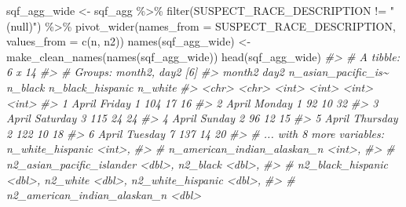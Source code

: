\documentclass[
]{krantz}
\makeatletter
\newenvironment{Shaded}{\begin{snugshade}}{\end{snugshade}}
\newcommand{\AttributeTok}[1]{\textcolor[rgb]{0.61,0.61,0.61}{#1}}
\newcommand{\CommentTok}[1]{\textcolor[rgb]{0.37,0.37,0.37}{\textit{#1}}}
\newcommand{\FunctionTok}[1]{\textcolor[rgb]{0,0,0}{#1}}
\newcommand{\NormalTok}[1]{#1}
\newcommand{\OtherTok}[1]{\textcolor[rgb]{0.37,0.37,0.37}{#1}}
\newcommand{\SpecialCharTok}[1]{\textcolor[rgb]{0,0,0}{#1}}
\newcommand{\StringTok}[1]{\textcolor[rgb]{0.5,0.5,0.5}{#1}}
\newenvironment{kframe}{%
\medskip{}
\setlength{\fboxsep}{.8em}
 \def\at@end@of@kframe{}%
 \ifinner\ifhmode%
  \def\at@end@of@kframe{\end{minipage}}%
  \begin{minipage}{\columnwidth}%
 \fi\fi%
 \def\FrameCommand##1{\hskip\@totalleftmargin \hskip-\fboxsep
 \colorbox{shadecolor}{##1}\hskip-\fboxsep
     \hskip-\linewidth \hskip-\@totalleftmargin \hskip\columnwidth}%
 \MakeFramed {\advance\hsize-\width
   \@totalleftmargin\z@ \linewidth\hsize
   \@setminipage}}%
 {\par\unskip\endMakeFramed%
 \at@end@of@kframe}
\renewenvironment{Shaded}{\begin{kframe}}{\end{kframe}}
\makeatother
\begin{document}
\begin{Shaded}
\begin{Highlighting}[]
\NormalTok{sqf\_agg\_wide }\OtherTok{\textless{}{-}}\NormalTok{ sqf\_agg }\SpecialCharTok{\%\textgreater{}\%}
  \FunctionTok{filter}\NormalTok{(SUSPECT\_RACE\_DESCRIPTION }\SpecialCharTok{!=} \StringTok{"(null)"}\NormalTok{) }\SpecialCharTok{\%\textgreater{}\%}
  \FunctionTok{pivot\_wider}\NormalTok{(}\AttributeTok{names\_from =}\NormalTok{ SUSPECT\_RACE\_DESCRIPTION, }\AttributeTok{values\_from =} \FunctionTok{c}\NormalTok{(n, n2)) }
\FunctionTok{names}\NormalTok{(sqf\_agg\_wide) }\OtherTok{\textless{}{-}} \FunctionTok{make\_clean\_names}\NormalTok{(}\FunctionTok{names}\NormalTok{(sqf\_agg\_wide))}
\FunctionTok{head}\NormalTok{(sqf\_agg\_wide)}
\CommentTok{\#\textgreater{} \# A tibble: 6 x 14}
\CommentTok{\#\textgreater{} \# Groups:   month2, day2 [6]}
\CommentTok{\#\textgreater{}   month2 day2     n\_asian\_pacific\_is\textasciitilde{} n\_black n\_black\_hispanic n\_white}
\CommentTok{\#\textgreater{}   \textless{}chr\textgreater{}  \textless{}chr\textgreater{}                  \textless{}int\textgreater{}   \textless{}int\textgreater{}            \textless{}int\textgreater{}   \textless{}int\textgreater{}}
\CommentTok{\#\textgreater{} 1 April  Friday                     1     104               17      16}
\CommentTok{\#\textgreater{} 2 April  Monday                     1      92               10      32}
\CommentTok{\#\textgreater{} 3 April  Saturday                   3     115               24      24}
\CommentTok{\#\textgreater{} 4 April  Sunday                     2      96               12      15}
\CommentTok{\#\textgreater{} 5 April  Thursday                   2     122               10      18}
\CommentTok{\#\textgreater{} 6 April  Tuesday                    7     137               14      20}
\CommentTok{\#\textgreater{} \# ... with 8 more variables: n\_white\_hispanic \textless{}int\textgreater{},}
\CommentTok{\#\textgreater{} \#   n\_american\_indian\_alaskan\_n \textless{}int\textgreater{},}
\CommentTok{\#\textgreater{} \#   n2\_asian\_pacific\_islander \textless{}dbl\textgreater{}, n2\_black \textless{}dbl\textgreater{},}
\CommentTok{\#\textgreater{} \#   n2\_black\_hispanic \textless{}dbl\textgreater{}, n2\_white \textless{}dbl\textgreater{}, n2\_white\_hispanic \textless{}dbl\textgreater{},}
\CommentTok{\#\textgreater{} \#   n2\_american\_indian\_alaskan\_n \textless{}dbl\textgreater{}}
\end{Highlighting}
\end{Shaded}
\end{document}
